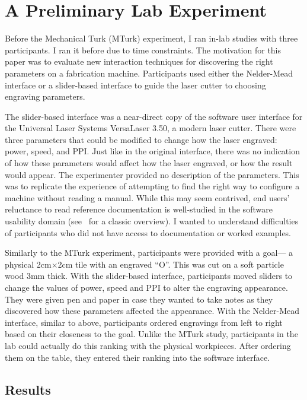 \section{A Preliminary Lab Experiment}

Before the Mechanical Turk (MTurk) experiment, I ran in-lab studies with three participants.
I ran it before due to time constraints.
The motivation for this paper was to evaluate new interaction techniques for discovering the right parameters on a fabrication machine.
Participants used either the Nelder-Mead interface or a slider-based interface to guide the laser cutter to choosing engraving parameters.

The slider-based interface was a near-direct copy of the software user interface for the Universal Laser Systems VersaLaser 3.50, a modern laser cutter.
There were three parameters that could be modified to change how the laser engraved:
power, speed, and PPI\@.
Just like in the original interface, there was no indication of how these parameters would affect how the laser engraved, or how the result would appear.
The experimenter provided no description of the parameters.
This was to replicate the experience of attempting to find the right way to configure a machine without reading a manual.
While this may seem contrived, end users' reluctance to read reference documentation is well-studied in the software usability domain (see~\cite{carroll_nurnberg_1990} for a classic overview).
I wanted to understand difficulties of participants who did not have access to documentation or worked examples.

Similarly to the MTurk experiment, participants were provided with a goal---
a physical 2cm$\times$2cm tile with an engraved ``O''.
This was cut on a soft particle wood 3mm thick.
With the slider-based interface, participants moved sliders to change the values of power, speed and PPI to alter the engraving appearance.
They were given pen and paper in case they wanted to take notes as they discovered how these parameters affected the appearance.
With the Nelder-Mead interface, similar to above, participants ordered engravings from left to right based on their closeness to the goal.
Unlike the MTurk study, participants in the lab could actually do this ranking with the physical workpieces.
After ordering them on the table, they entered their ranking into the software interface.

\subsection{Results}

